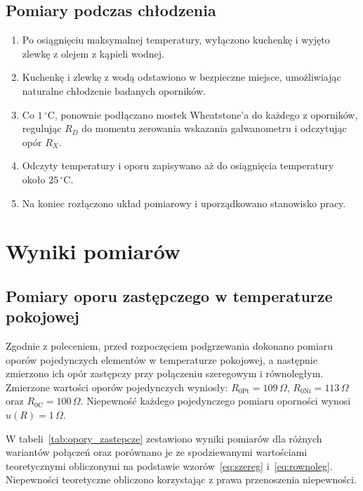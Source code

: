 \documentclass[12pt, a4paper]{article}
\begin{document}
\subsection{Pomiary podczas chłodzenia}
\begin{enumerate}
    \item Po osiągnięciu maksymalnej temperatury, wyłączono kuchenkę i wyjęto zlewkę z olejem z kąpieli wodnej.
    \item Kuchenkę i zlewkę z wodą odstawiono w bezpieczne miejsce, umożliwiając naturalne chłodzenie badanych oporników.
    \item Co $1\,^\circ\mathrm{C}$, ponownie podłączano mostek Wheatstone'a do każdego z oporników, regulując $R_D$ do momentu zerowania wskazania galwanometru i odczytując opór $R_X$.
    \item Odczyty temperatury i oporu zapisywano aż do osiągnięcia temperatury około $25\,^\circ\mathrm{C}$.
    \item Na koniec rozłączono układ pomiarowy i uporządkowano stanowisko pracy.
\end{enumerate}

\section{Wyniki pomiarów}

\subsection{Pomiary oporu zastępczego w temperaturze pokojowej}

Zgodnie z poleceniem, przed rozpoczęciem podgrzewania dokonano pomiaru oporów pojedynczych elementów w temperaturze pokojowej, a następnie zmierzono ich opór zastępczy przy połączeniu szeregowym i równoległym.
Zmierzone wartości oporów pojedynczych wyniosły:
$R_{0\text{Pt}} = 109\,\Omega$, $R_{0\text{Ni}} = 113\,\Omega$ oraz $R_{0\text{C}} = 100\,\Omega$.
Niepewność każdego pojedynczego pomiaru oporności wynosi $u(R) = 1\,\Omega$.

W tabeli~\ref{tab:opory_zastepcze} zestawiono wyniki pomiarów dla różnych wariantów połączeń oraz porównano je ze spodziewanymi wartościami teoretycznymi obliczonymi na podstawie wzorów~\eqref{eq:szereg} i~\eqref{eq:rownoleg}. Niepewności teoretyczne obliczono korzystając z prawa przenoszenia niepewności.
\end{document}
